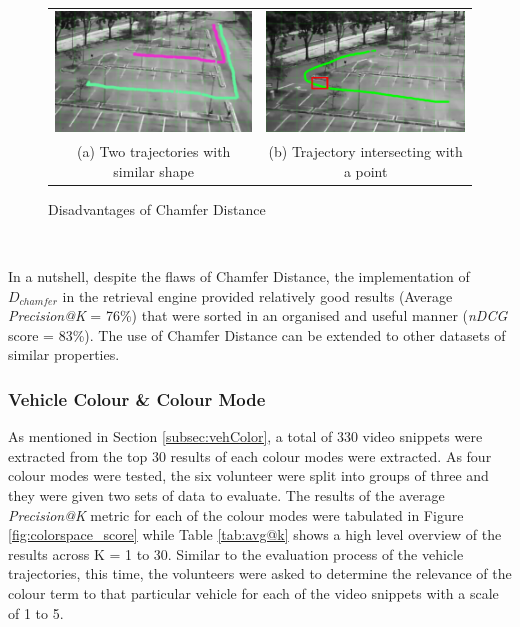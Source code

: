 \begin{figure}[htb!]
  \centering
\begin{tabular}{cc }
 \includegraphics[width=0.45\linewidth]{image/retrievalTwo/chamferDisadv2.png} &
 \includegraphics[width=0.45\linewidth]{image/retrievalTwo/chamferDisadv1.png} \\
 (a) Two trajectories with similar shape &
 (b) Trajectory intersecting with a point \\
\end{tabular}
\caption{Disadvantages of Chamfer Distance} \label{fig:chamferDisadvantage}
\end{figure}



 \\


In a nutshell, despite the flaws of Chamfer Distance, the implementation of $D_{chamfer}$ in the retrieval engine provided relatively good results (Average \textit{Precision@K} = 76\%) that were sorted in an organised and useful manner (\textit{nDCG} score = 83\%). The use of Chamfer Distance can be extended to other datasets of similar properties.

\subsubsection{Vehicle Colour \& Colour Mode}
\label{subsec:vehiclecolourchamferdistanceexperiment}

As mentioned in Section \ref{subsec:vehColor}, a total of 330 video snippets were extracted from the top 30 results of each colour modes were extracted. As four colour modes were tested, the six volunteer were split into groups of three and they were given two sets of data to evaluate.
The results of the average \textit{Precision@K} metric for each of the colour modes were tabulated in Figure \ref{fig:colorspace_score} while Table \ref{tab:avg@k} shows a high level overview of the results across K = 1 to 30. Similar to the evaluation process of the vehicle trajectories, this time, the volunteers were asked to determine the relevance of the colour term to that particular vehicle for each of the video snippets with a scale of 1 to 5.


